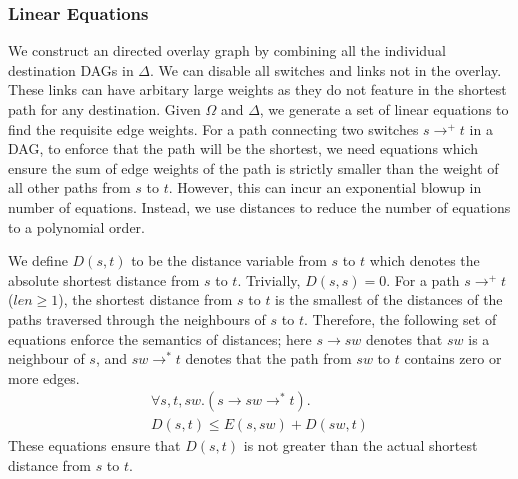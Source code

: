 \subsubsection{Linear Equations} \label{sec:linearequations}
We construct an directed overlay graph
by combining all the individual destination DAGs in $\Delta$.
We can disable all switches and links not in the overlay. 
These links can have arbitary large weights as they do not
feature in the shortest path for any destination. 
Given $\Omega$ and $\Delta$, we generate a set of linear equations
to find the requisite edge weights. For a path connecting two switches 
$s \rightarrow^+ t$ in a DAG, 
to enforce that the path will be the shortest, we need equations
which ensure the sum of edge weights of the path is strictly smaller than
the weight of all other paths from $s$ to $t$. However, this can incur
an exponential blowup in number of equations. Instead, we use distances 
to reduce the number of equations to a polynomial order. 

We define $D(s,t)$ to be the distance variable from $s$ to $t$
which denotes the absolute shortest distance from $s$ to $t$. 
Trivially, $D(s,s) = 0$. For a path $s \rightarrow^+ t$ ($len \geq 1$),
the shortest distance from $s$ to $t$ is the smallest of the distances
of the paths traversed through the neighbours of $s$ to $t$. Therefore, the
following set of equations enforce the semantics of distances; 
here $s \rightarrow sw$ denotes that $sw$ is a neighbour
of $s$, and $sw \rightarrow^* t$ denotes that the path from $sw$ to $t$ contains
zero or more edges.
\begin{multline} \label{eq:dist}
\forall s, t, sw. (s \rightarrow sw \rightarrow^* t).\\
D(s, t) \leq E(s, sw) + D(sw, t)
\end{multline}
These equations ensure that $D(s,t)$ is not greater than 
the actual shortest distance from $s$ to $t$.

